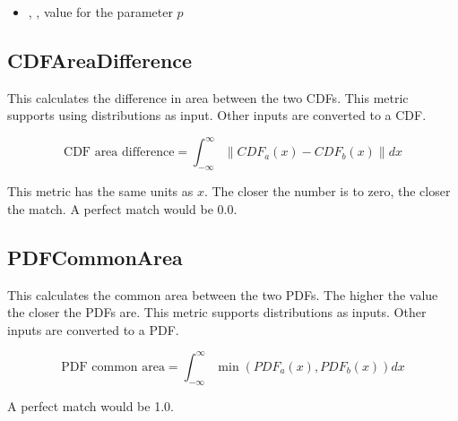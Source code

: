 

\begin{itemize}
  \item {}, , value for the parameter $p$
\end{itemize}

\subsection{CDFAreaDifference}

This calculates the difference in area between the two CDFs.  This
metric supports using distributions as input.  Other inputs are
converted to a CDF.

\begin{equation}
  \text{CDF area difference} = \int_{-\infty}^{\infty}{\|CDF_a(x)-CDF_b(x)\|dx}
\end{equation}

This metric has the same units as $x$.  The closer the number is
to zero, the closer the match.  A perfect match would be 0.0.

\subsection{PDFCommonArea}

This calculates the common area between the two PDFs.  The higher the
value the closer the PDFs are.  This metric supports distributions as
inputs.  Other inputs are converted to a PDF.

\begin{equation}
  \text{PDF common area} = \int_{-\infty}^{\infty}{\min(PDF_a(x),PDF_b(x))}dx
\end{equation}

A perfect match would be 1.0.
